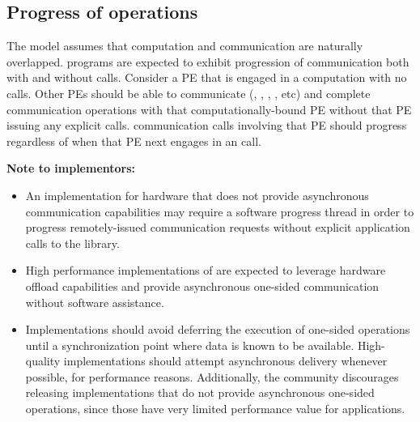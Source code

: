 \subsection{Progress of \openshmem operations}
\label{subsec:progress}
The \openshmem model assumes that computation and communication are naturally overlapped. \openshmem programs are expected to exhibit progression of communication both with and without \openshmem calls. Consider a \ac{PE} that is engaged in a computation with no \openshmem calls. Other \ac{PE}s should be able to communicate (, , , , etc) and complete communication operations with that computationally-bound \ac{PE} without that \ac{PE} issuing any explicit \openshmem calls. \openshmem communication calls involving that \ac{PE} should progress regardless of when that \ac{PE} next engages in an \openshmem call.

\textbf{Note to implementors:}

\begin{itemize}
\item An \openshmem implementation for hardware that does not provide asynchronous communication capabilities may require a software progress thread in order to progress remotely-issued communication requests without explicit application calls to the \openshmem library.
\item High performance implementations of \openshmem are expected to leverage hardware offload capabilities and
    provide asynchronous one-sided communication without software assistance.
\item Implementations should avoid deferring the execution of one-sided operations until a synchronization point where data is known to be available. High-quality implementations should attempt asynchronous delivery whenever possible, for performance reasons. Additionally, the \openshmem community discourages releasing \openshmem implementations that do not provide asynchronous one-sided operations, since those have very limited performance value for \openshmem applications.
\end{itemize}

%
%

